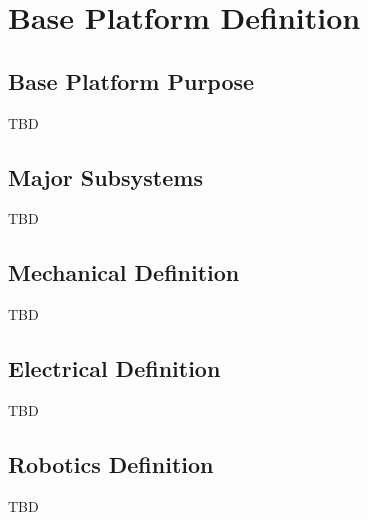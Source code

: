 \chapter{Base Platform Definition}

\section{Base Platform Purpose}

TBD

\section{Major Subsystems}

TBD

\section{Mechanical Definition}

TBD

\section{Electrical Definition}

TBD

\section{Robotics Definition}

TBD
